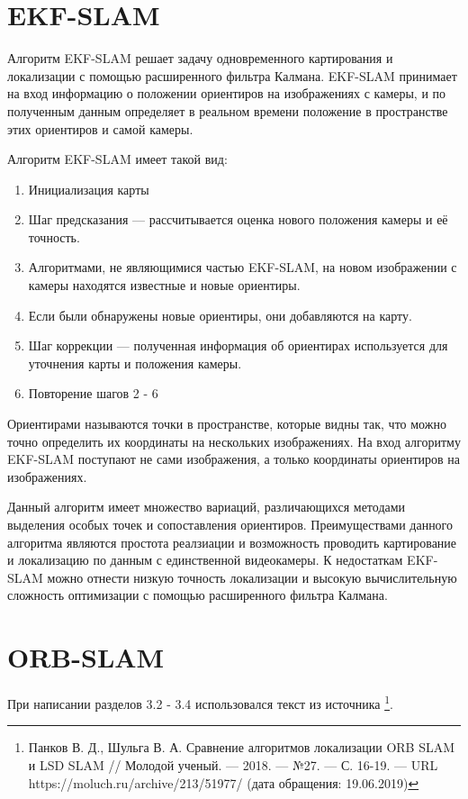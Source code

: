 \documentclass{mipt-thesis-bs}
\begin{document}
\section{EKF-SLAM}
Алгоритм EKF-SLAM решает задачу одновременного картирования и локализации с помощью расширенного фильтра Калмана. EKF-SLAM принимает на вход информацию о положении ориентиров на изображениях с камеры, и по полученным данным определяет в реальном времени положение в пространстве этих ориентиров и самой камеры.

Алгоритм EKF-SLAM имеет такой вид:

\begin{enumerate}
\item Инициализация карты
\item Шаг предсказания — рассчитывается оценка нового положения камеры и её точность.
\item Алгоритмами, не являющимися частью EKF-SLAM, на новом изображении с камеры находятся известные и новые ориентиры.
\item Если были обнаружены новые ориентиры, они добавляются на карту.
\item Шаг коррекции — полученная информация об ориентирах используется для уточнения карты и положения камеры.
\item Повторение шагов 2 - 6
\end{enumerate}

Ориентирами называются точки в пространстве, которые видны так, что можно точно определить их координаты на нескольких изображениях. На вход алгоритму EKF-SLAM поступают не сами изображения, а только координаты ориентиров на изображениях.

Данный алгоритм имеет множество вариаций, различающихся методами выделения особых точек и сопоставления ориентиров. Преимуществами данного алгоритма являются простота реалзиации и возможность проводить картирование и локализацию по данным с единственной видеокамеры. К недостаткам EKF-SLAM можно отнести низкую точность локализации и высокую вычислительную сложность оптимизации с помощью расширенного фильтра Калмана.

\section{ORB-SLAM}

При написании разделов 3.2 - 3.4 использовался текст из источника \footnote{Панков В. Д., Шульга В. А. Сравнение алгоритмов локализации ORB SLAM и LSD SLAM // Молодой ученый. — 2018. — №27. — С. 16-19. — URL https://moluch.ru/archive/213/51977/ (дата обращения: 19.06.2019)}.
\end{document}
